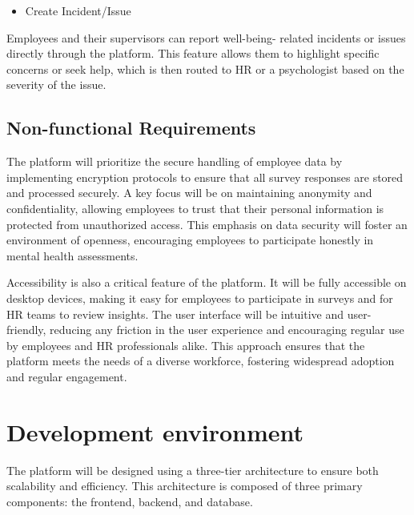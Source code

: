 \documentclass[conference]{IEEEtran}
\begin{document}
            \begin{itemize}
                \item Create Incident/Issue
            \end{itemize}
                       
            Employees and their supervisors can report well-being-
            related incidents or issues directly through the platform. This
            feature allows them to highlight specific concerns or seek
            help, which is then routed to HR or a psychologist based on
            the severity of the issue.
            
        \subsection{Non-functional Requirements}
        
            The platform will prioritize the secure handling of
            employee data by implementing encryption protocols to
            ensure that all survey responses are stored and processed
            securely. A key focus will be on maintaining anonymity and
            confidentiality, allowing employees to trust that their personal
            information is protected from unauthorized access. This
            emphasis on data security will foster an environment of
            openness, encouraging employees to participate honestly in
            mental health assessments.\newline
        
            Accessibility is also a critical feature of the platform. It
            will be fully accessible on desktop devices, making it easy for
            employees to participate in surveys and for HR teams to
            review insights. The user interface will be intuitive and user-
            friendly, reducing any friction in the user experience and
            encouraging regular use by employees and HR professionals
            alike. This approach ensures that the platform meets the needs
            of a diverse workforce, fostering widespread adoption and
            regular engagement.
    
    \section{Development environment}
    
        The platform will be designed using a three-tier
        architecture to ensure both scalability and efficiency. This
        architecture is composed of three primary components: the
        frontend, backend, and database.\newline
        
\end{document}
